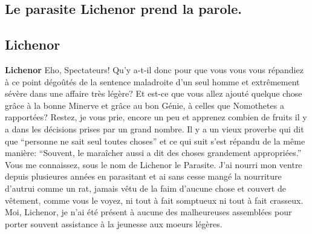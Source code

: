 \documentclass[12pt]{book}
\begin{document}
\begin{pages}
        \begin{Rightside}
        \beginnumbering
            \pstart\section*{Le parasite Lichenor prend la parole.}\pend\pstart\subsection*{Lichenor}\pend\pstart\textbf{Lichenor}\hspace{1cm} 
                        Eho, Spectateurs! 
                        Qu'y a-t-il donc pour que vous vous vous répandiez à ce point dégoûtés de la sentence maladroite d’un seul homme et extrêmement sévère dans une affaire très légère?
                        Et est-ce que vous allez ajouté quelque chose grâce à la bonne Minerve et grâce au bon Génie, à celles que Nomothetes a rapportées? 
                        Restez, je vous prie, encore un peu et apprenez combien de fruits il y a dans les décisions prises par un grand nombre.
                        Il y a un vieux proverbe qui dit que “personne ne sait seul toutes choses” et ce qui suit s’est répandu de la même manière: “Souvent, le maraîcher aussi a dit des choses grandement appropriées.” 
                        Vous me connaissez, sous le nom de Lichenor le Parasite. J’ai nourri mon ventre depuis plusieures années en parasitant et ai sans cesse mangé la nourriture d’autrui comme un rat, jamais vêtu de la faim d’aucune chose et couvert de vêtement, comme vous le voyez, ni tout à fait somptueux ni tout à fait crasseux.
                        Moi, Lichenor, je n’ai été présent à aucune des malheureuses assemblées pour porter souvent assistance à la jeunesse aux moeurs légères. 
                        
                    \pend
        \endnumbering
        \end{Rightside}
        \end{pages}
        \Pages
        
\end{document}
